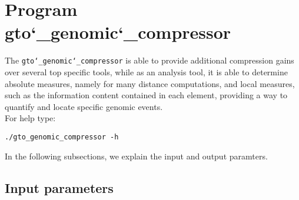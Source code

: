 \section{Program gto\char`_genomic\char`_compressor}
The \texttt{gto\char`_genomic\char`_compressor} is able to provide additional compression gains over several top specific tools, while as an analysis tool, it is able to determine absolute measures, namely for many distance computations, and local measures, such as the information content contained in each element, providing a way to quantify and locate specific genomic events.\\
For help type:
\begin{lstlisting}
./gto_genomic_compressor -h
\end{lstlisting}
In the following subsections, we explain the input and output paramters.

\subsection*{Input parameters}

